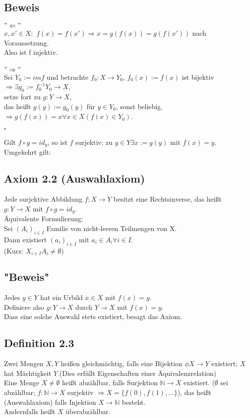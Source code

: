 \documentclass {article}
\begin{document}
\subsection*{Beweis}
$"\Leftarrow"$ \\
$x,x' \in X :$
$f(x) = f(x') \Rightarrow  x = g(f(x)) = g(f(x'))$ nach Voraussetzung.\\
Also ist f injektiv. \\ 
\\
$"\Rightarrow"$\\
Sei $Y_0 := im f$ und betrachte $f_0 : X \rightarrow Y_0$, $f_0(x) := f(x)$ ist bijektiv \\
 $\Rightarrow \exists g_0 := f_0^{-1} Y_0 \rightarrow X$,\\
setze fort zu $g: Y \rightarrow X$,\\
das heißt $g(y) := g_0(y)$ für $y\in Y_0$, sonst beliebig.\\
$\Rightarrow g(f(x)) = x \forall  x \in X (f(x) \in Y_0)$.\\
\begin{flushright}
$\square$\\
\end{flushright}
Gilt $f \circ g = id_y$, so ist $f$ surjektiv: zu $y\in Y \exists x:= g(y)$ mit $f(x) = y$.\\
Umgekehrt gilt:
\subsection{Axiom 2.2 (Auswahlaxiom)}
Jede surjektive Abbildung $f: X \rightarrow Y$ besitzt eine Rechtsinverse, das heißt \\
$g: Y \rightarrow X$ mit $f \circ g = id_y$.\\
Äquivalente Formulierung:\\
Sei $(A_i)_{i \in I}$ Familie von nicht-leeren Teilmengen von X.\\
Dann existiert $(a_i)_{i \in I}$ mit $a_i \in A_i \forall i \in I$.\\
(Kurz: $X_{i \in I} A_i \neq \emptyset $)
\subsection*{"Beweis"}
Jedes $y \in Y$ hat ein Urbild $x \in X$ mit $f(x) = y$.\\
Definiere also $g: Y \rightarrow X$ durch $Y \rightarrow X$ mit $f(x) = y$.\\
Dass eine solche Auswahl stets existiert, besagt das Axiom.
\subsection{Definition 2.3}
Zwei Mengen $X,Y$ heißen gleichmächtig, falls eine Bijektion $\phi X \rightarrow Y$ existiert; $X$ hat Mächtigkeit $Y$.(Dies erfüllt Eigenschaften einer Äquivalenzrelation)\\
Eine Menge $X \neq \emptyset$ heißt abzählbar, falls Surjektion $\mathbb{N} \rightarrow X$ existiert. ($\emptyset$ sei abzählbar; $f: \mathbb{N} \rightarrow X$ surjektiv $\Rightarrow X = \{f(0), f(1), ...\}$), das heißt (Auswahlaxiom) falls  Injektion $X \rightarrow \mathbb{N}$ besteht.\\
Andernfalls heißt $X$ überabzählbar.
\end{document}
